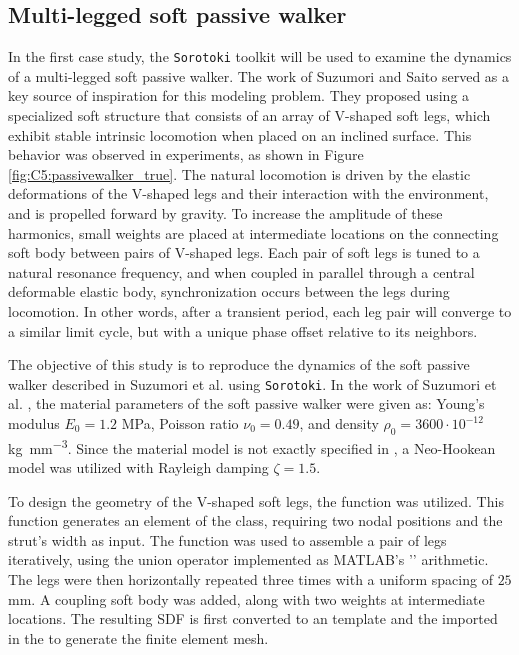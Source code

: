 \subsection{Multi-legged soft passive walker}
\label{sec:C5:suzumori_walker}
In the first case study, the \texttt{Sorotoki} toolkit will be used to examine the dynamics of a multi-legged soft passive walker. The work of Suzumori and Saito \cite{Suzumori2008Sep} served as a key source of inspiration for this modeling problem. They proposed using a specialized soft structure that consists of an array of V-shaped soft legs, which exhibit stable intrinsic locomotion when placed on an inclined surface. This behavior was observed in experiments, as shown in Figure \ref{fig:C5:passivewalker_true}. The natural locomotion is driven by the elastic deformations of the V-shaped legs and their interaction with the environment, and is propelled forward by gravity. To increase the amplitude of these harmonics, small weights are placed at intermediate locations on the connecting soft body between pairs of V-shaped legs. Each pair of soft legs is tuned to a natural resonance frequency, and when coupled in parallel through a central deformable elastic body, synchronization occurs between the legs during locomotion. In other words, after a transient period, each leg pair will converge to a similar limit cycle, but with a unique phase offset relative to its neighbors.

The objective of this study is to reproduce the dynamics of the soft passive walker described in Suzumori et al. \cite{Suzumori2008Sep} using \texttt{Sorotoki}. In the work of Suzumori et al. \cite{Suzumori2008Sep}, the material parameters of the soft passive walker were given as: Young's modulus $E_0 = 1.2$ \si{\mega \pascal}, Poisson ratio $\nu_0 = 0.49$, and density $\rho_0 = 3600 \cdot 10^{-12}$ \si{\kilo \gram \per \milli \metre \cubed}. Since the material model is not exactly specified in \cite{Suzumori2008Sep}, a Neo-Hookean model was utilized with Rayleigh damping $\zeta = 1.5$.

To design the geometry of the V-shaped soft legs, the  function was utilized. This function generates an element of the  class, requiring two nodal positions  and the strut's width  as input. The function was used to assemble a pair of legs iteratively, using the union operator implemented as {MATLAB}'s '\code{+}' arithmetic. The legs were then horizontally repeated three times with a uniform spacing of $25$ \si{\milli \metre}. A coupling soft body was added, along with two weights at intermediate locations. The resulting SDF is first converted to an  template and the imported in the  to generate the finite element mesh. %

